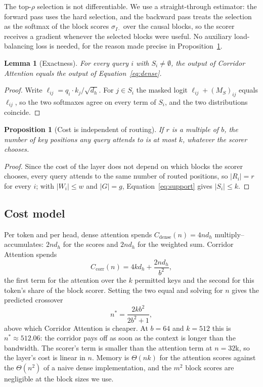 \documentclass[11pt]{article}
\newtheorem{lemma}{Lemma}
\newtheorem{proposition}{Proposition}
\begin{document}
The top-$\rho$ selection is not differentiable. We use a straight-through
estimator: the forward pass uses the hard selection, and the backward pass
treats the selection as the softmax of the block scores $\sigma_{I\cdot}$
over the causal blocks, so the scorer receives a gradient whenever the
selected blocks were useful. No auxiliary load-balancing loss is needed, for
the reason made precise in Proposition~\ref{prop:cost}.

\begin{lemma}[Exactness]\label{lem:exact}
For every query $i$ with $S_i \ne \emptyset$, the output of Corridor
Attention equals the output of Equation~\eqref{eq:dense}.
\end{lemma}
\begin{proof}
Write $\ell_{ij} = q_i \cdot k_j / \sqrt{d_h}$. For $j \in S_i$ the masked
logit $\ell_{ij} + (M_S)_{ij}$ equals $\ell_{ij}$, so the two softmaxes
agree on every term of $S_i$, and the two distributions coincide.
\end{proof}

\begin{proposition}[Cost is independent of routing]\label{prop:cost}
If $r$ is a multiple of $b$, the number of key positions any query attends
to is at most $k$, whatever the scorer chooses.
\end{proposition}
\begin{proof}
Since the cost of the layer does not depend on which blocks the scorer
chooses, every query attends to the same number of routed positions, so
$|R_i| = r$ for every $i$; with $|W_i| \le w$ and $|G| = g$,
Equation~\eqref{eq:support} gives $|S_i| \le k$.
\end{proof}

\subsection{Cost model}\label{sec:cost}

Per token and per head, dense attention spends
$C_{\mathrm{dense}}(n) = 4 n d_h$ multiply--accumulates: $2 n d_h$ for the
scores and $2 n d_h$ for the weighted sum. Corridor Attention spends
\begin{equation}\label{eq:cost}
  C_{\mathrm{corr}}(n) = 4 k d_h + \frac{2 n d_h}{b^{2}} ,
\end{equation}
the first term for the attention over the $k$ permitted keys and the second
for this token's share of the block scorer. Setting the two equal and
solving for $n$ gives the predicted crossover
\begin{equation}\label{eq:crossover}
  n^{*} = \frac{2 k b^{2}}{2 b^{2} + 1} ,
\end{equation}
above which Corridor Attention is cheaper. At $b = 64$ and $k = 512$ this is
$n^{*} \approx 512.06$: the corridor pays off as soon as the context is
longer than the bandwidth. The scorer's term is smaller than the attention
term at $n = 32$k, so the layer's cost is linear in $n$. Memory is
$\Theta(nk)$ for the attention scores against the $\Theta(n^2)$ of a naive
dense implementation, and the $m^2$ block scores are negligible at the block
sizes we use.
\end{document}
